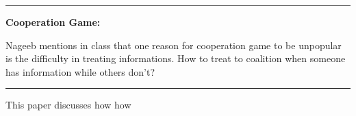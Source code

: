 \documentclass{book}
\theoremstyle{plain}
\theoremstyle{definition}
\newcommand{\myline}{\vspace{3mm} \hrule \vspace{4mm}}
\begin{document}
\myline

\noindent
\textbf{Cooperation Game:}

Nageeb mentions in class that one reason for cooperation game to be unpopular is the difficulty in treating informations.
How to treat to coalition when someone has information while others don't?

\myline

\noindent
\textbf{}

This paper discusses how how




















\end{document}
